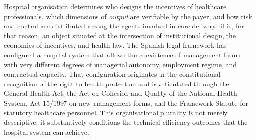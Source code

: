 


Hospital organisation determines who designs the incentives of 
healthcare professionals, which dimensions of \textit{output} are 
verifiable by the payer, and how risk and control are distributed 
among the agents involved in care delivery: it is, for that reason, 
an object situated at the intersection of institutional design, 
the economics of incentives, and health law. The Spanish legal 
framework has configured a hospital system that allows the coexistence 
of management forms with very different degrees of managerial autonomy, 
employment regime, and contractual capacity. That configuration 
originates in the constitutional recognition of the right to health 
protection and is articulated through the General Health Act, the 
Act on Cohesion and Quality of the National Health System, Act 
15/1997 on new management forms, and the Framework Statute for 
statutory healthcare personnel. This organisational plurality is 
not merely descriptive: it substantively conditions the technical 
efficiency outcomes that the hospital system can achieve.

